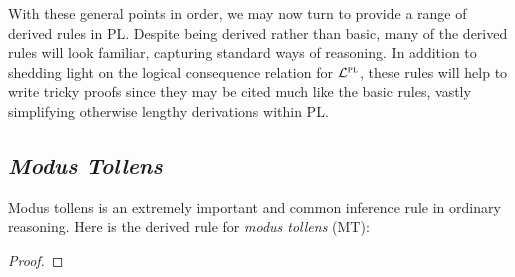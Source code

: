 With these general points in order, we may now turn to provide a range of derived rules in PL.
Despite being derived rather than basic, many of the derived rules will look familiar, capturing standard ways of reasoning.
In addition to shedding light on the logical consequence relation for $\mathcal{L}^{\textsc{pl}}$, these rules will help to write tricky proofs since they may be cited much like the basic rules, vastly simplifying otherwise lengthy derivations within PL.







\subsection{\textit{Modus Tollens}}

Modus tollens is an extremely important and common inference rule in ordinary reasoning.
Here is the derived rule for \textit{modus tollens} (MT):

\begin{proof}
	 
\end{proof}

